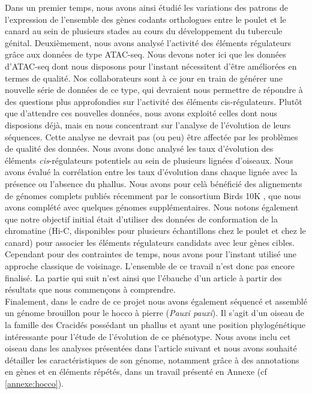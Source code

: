 Dans un premier temps, nous avons ainsi étudié les variations des patrons de l’expression de l’ensemble des gènes codants orthologues entre le poulet et le canard au sein de plusieurs stades au cours du développement du tubercule génital. Deuxièmement, nous avons analysé l'activité des éléments régulateurs grâce aux données de type ATAC-seq. Nous devons noter ici que les données d'ATAC-seq dont nous disposons pour l'instant nécessitent d'être améliorées en termes de qualité. Nos collaborateurs sont à ce jour en train de générer une nouvelle série de données de ce type, qui devraient nous permettre de répondre à des questions plus approfondies sur l'activité des éléments \gls{cis}-régulateurs. Plutôt que d'attendre ces nouvelles données, nous avons exploité celles dont nous disposions déjà, mais en nous concentrant sur l'analyse de l'évolution de leurs séquences. Cette analyse ne devrait pas (ou peu) être affectée par les problèmes de qualité des données. Nous avons donc analysé les taux d’évolution des éléments \textit{cis}-régulateurs potentiels au sein de plusieurs lignées d’oiseaux. Nous avons évalué la corrélation entre les taux d'évolution dans chaque lignée avec la présence ou l’absence du phallus. Nous avons pour celà bénéficié des alignements de génomes complets publiés récemment par le consortium Birds 10K \citep{feng_dense_2020}, que nous avons complété avec quelques génomes supplémentaires. Nous notons également que notre objectif initial était d’utiliser des données de conformation de la chromatine (\acrshort{Hi-C}, disponibles pour plusieurs échantillons chez le poulet et chez le canard) pour associer les éléments régulateurs candidats avec leur gènes cibles. Cependant pour des contraintes de temps, nous avons pour l’instant utilisé une approche classique de voisinage. L’ensemble de ce travail n’est donc pas encore finalisé. La partie qui suit n’est ainsi que l’ébauche d’un article à partir des résultats que nous commençons à comprendre. \\

Finalement, dans le cadre de ce projet nous avons également séquencé et assemblé un génome brouillon pour le hocco à pierre (\textit{Pauxi pauxi}). Il s’agit d’un oiseau de la famille des Cracidés possédant un phallus et ayant une position phylogénétique intéressante pour l’étude de l’évolution de ce phénotype. Nous avons inclu cet oiseau dans les analyses présentées dans l’article suivant et nous avons souhaité détailler les caractéristiques de son génome, notamment grâce à des annotations en gènes et en éléments répétés, dans un travail présenté en Annexe (cf \ref{annexe:hocco}).
